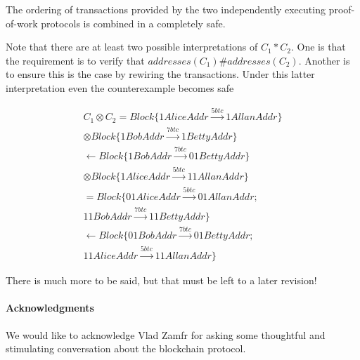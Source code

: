 \documentclass[fleqn]{acm_proc_article-sp}
\numberwithin{equation}{subsection}
\begin{document}
The ordering of transactions provided by the two independently
executing proof-of-work protocols is combined in a completely safe.

Note that there are at least two possible interpretations of $C_1 *
C_2$. One is that the requirement is to verify that $addresses( C_1 ) \#
addresses( C_2 )$. Another is to ensure this is the case by rewiring the
transactions. Under this latter interpretation even the counterexample
becomes safe

\begin{equation*}
  \begin{aligned} 
    C_1 \otimes C_2  =  Block\{ 1AliceAddr \xrightarrow{5btc} 1AllanAddr \} \\
    \otimes Block\{ 1BobAddr \xrightarrow{7btc} 1BettyAddr \} \\
    \leftarrow Block\{ 1BobAddr \xrightarrow{7btc} 01BettyAddr \} \\
    \otimes Block\{ 1AliceAddr \xrightarrow{5btc} 11AllanAddr \} \\
    = Block\{ 01AliceAddr \xrightarrow{5btc} 01AllanAddr ; \\
    11BobAddr \xrightarrow{7btc} 11BettyAddr \} \\
    \leftarrow Block\{ 01BobAddr \xrightarrow{7btc} 01BettyAddr ; \\
    11AliceAddr \xrightarrow{5btc} 11AllanAddr \}
  \end{aligned}
\end{equation*}

There is much more to be said, but that must be left to a later revision!

\paragraph{Acknowledgments}
We would like to acknowledge Vlad Zamfr for asking some thoughtful
and stimulating conversation about the blockchain protocol.







\end{document}
